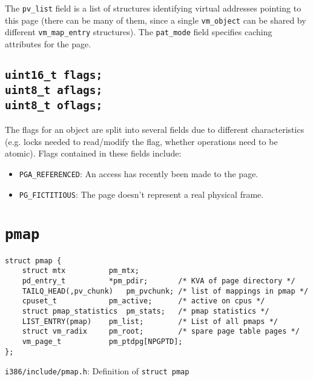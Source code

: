 \documentclass[shortabstract, english]{iithesis}
\begin{document}
The \texttt{pv_list} field is a list of structures identifying virtual
addresses pointing to this page (there can be many of them, since a single
\texttt{vm_object} can be shared by different
\texttt{vm_map_entry} structures). The \texttt{pat_mode} field
specifies caching attributes for the page.

\subsection*{\texttt{uint16_t flags;} \\ \texttt{uint8_t aflags;}
  \\ \texttt{uint8_t oflags;}}

The flags for an object are split into several fields due to different
characteristics (e.g. locks needed to read/modify the flag, whether operations
need to be atomic). Flags contained in these fields include:

\begin{itemize}
  \item \texttt{PGA_REFERENCED}: An access has recently been made to the page.
  \item \texttt{PG_FICTITIOUS}: The page doesn't represent a real physical frame.
\end{itemize}


\section{\texttt{pmap}}

\begin{listing}[H]
\begin{verbatim}
struct pmap {
    struct mtx          pm_mtx;
    pd_entry_t          *pm_pdir;       /* KVA of page directory */
    TAILQ_HEAD(,pv_chunk)   pm_pvchunk; /* list of mappings in pmap */
    cpuset_t            pm_active;      /* active on cpus */
    struct pmap_statistics  pm_stats;   /* pmap statistics */
    LIST_ENTRY(pmap)    pm_list;        /* List of all pmaps */
    struct vm_radix     pm_root;        /* spare page table pages */
    vm_page_t           pm_ptdpg[NPGPTD];
};
\end{verbatim}
\caption{\texttt{i386/include/pmap.h}: Definition of \texttt{struct pmap}}
\end{listing}
\end{document}
